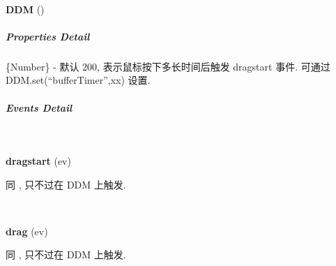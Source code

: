 \documentclass[letterpaper,10pt,english]{sphinxmanual}
\begin{document}
\begin{fulllineitems}
\label{api/component/dd/ddm:DDM.DDM}~
\begin{DUlineblock}{0em}
\item[] \textbf{DDM} ()
\end{DUlineblock}

\end{fulllineitems}



\subparagraph{Properties Detail}
\label{api/component/dd/ddm:properties-detail}

\begin{fulllineitems}
\label{api/component/dd/ddm:DDM.bufferTimer}
\{Number\} - 默认 200, 表示鼠标按下多长时间后触发 dragstart 事件.  可通过 DDM.set(``bufferTimer'',xx) 设置.

\end{fulllineitems}



\subparagraph{Events Detail}
\label{api/component/dd/ddm:events-detail}

\begin{fulllineitems}
\label{api/component/dd/ddm:DDM.dragstart}~
\begin{DUlineblock}{0em}
\item[] \textbf{dragstart} (ev)
\item[] 同 {\hyperref[api/component/dd/draggable:Draggable.dragstart]{}} , 只不过在 DDM 上触发.
\end{DUlineblock}

\end{fulllineitems}



\begin{fulllineitems}
\label{api/component/dd/ddm:DDM.drag}~
\begin{DUlineblock}{0em}
\item[] \textbf{drag} (ev)
\item[] 同 {\hyperref[api/component/dd/draggable:Draggable.drag]{}} , 只不过在 DDM 上触发.
\end{DUlineblock}

\end{fulllineitems}
\end{document}
